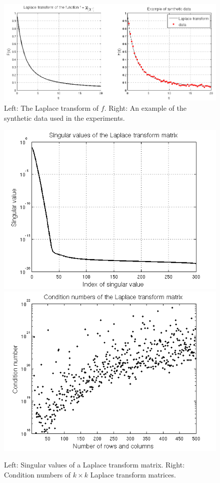 \documentclass[12pt,a4]{article}
\begin{document}
\begin{figure}[t]
\begin{center}
\includegraphics[scale=.5]{img/laplace_data.png}
\end{center}
\caption{Left: The Laplace transform of $f$. Right: An example of the synthetic data used in the experiments.}
\label{fig:laplace}
\end{figure}

\begin{figure}[t]
\begin{center}
\includegraphics[scale=.4]{img/singular.png}
\includegraphics[scale=.4]{img/cond.png}
\end{center}
\caption{Left: Singular values of a Laplace transform matrix. Right: Condition numbers of $k \times k$ Laplace transform matrices.}
\label{fig:singular}
\end{figure}
\end{document}
